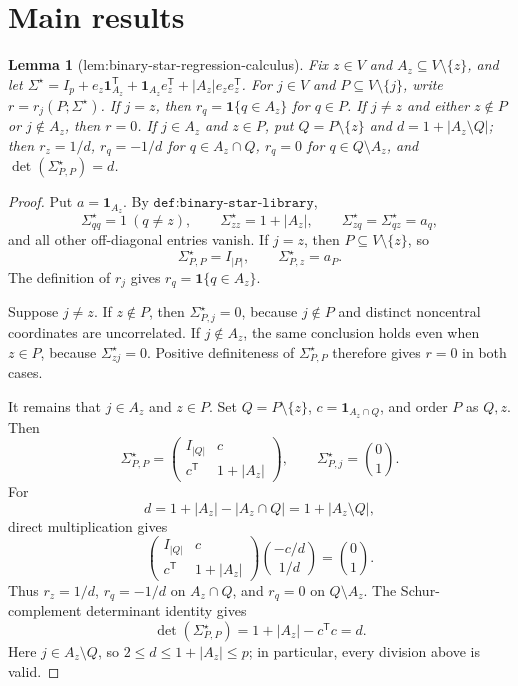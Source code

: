 \documentclass{article}
\newtheorem{lemma}{Lemma}
\begin{document}
\section{Main results}

\begin{lemma}[lem:binary-star-regression-calculus]\label{lem:binary-star-regression-calculus}
Fix \(z\in V\) and \(A_z\subseteq V\setminus\{z\}\), and let \(\Sigma^{\star}=I_p+e_z\mathbf 1_{A_z}^{\mathsf T}+\mathbf 1_{A_z}e_z^{\mathsf T}+|A_z|e_ze_z^{\mathsf T}\). For \(j\in V\) and \(P\subseteq V\setminus\{j\}\), write \(r=r_j(P;\Sigma^{\star})\). If \(j=z\), then \(r_q=\mathbf 1\{q\in A_z\}\) for \(q\in P\). If \(j\neq z\) and either \(z\notin P\) or \(j\notin A_z\), then \(r=0\). If \(j\in A_z\) and \(z\in P\), put \(Q=P\setminus\{z\}\) and \(d=1+|A_z\setminus Q|\); then \(r_z=1/d\), \(r_q=-1/d\) for \(q\in A_z\cap Q\), \(r_q=0\) for \(q\in Q\setminus A_z\), and \(\det(\Sigma^{\star}_{P,P})=d\).
\end{lemma}
\begin{proof}
Put \(a=\mathbf 1_{A_z}\).  By \(\texttt{def:binary-star-library}\),
\[
 \Sigma^{\star}_{qq}=1\ (q\ne z),\qquad
 \Sigma^{\star}_{zz}=1+|A_z|,\qquad
 \Sigma^{\star}_{zq}=\Sigma^{\star}_{qz}=a_q,
\]
and all other off-diagonal entries vanish.  If \(j=z\), then \(P\subseteq V\setminus\{z\}\), so
\[
 \Sigma^{\star}_{P,P}=I_{|P|},\qquad \Sigma^{\star}_{P,z}=a_P.
\]
The definition of \(r_j\) gives \(r_q=\mathbf 1\{q\in A_z\}\).

Suppose \(j\ne z\).  If \(z\notin P\), then \(\Sigma^{\star}_{P,j}=0\), because \(j\notin P\) and distinct noncentral coordinates are uncorrelated.  If \(j\notin A_z\), the same conclusion holds even when \(z\in P\), because \(\Sigma^{\star}_{zj}=0\).  Positive definiteness of \(\Sigma^{\star}_{P,P}\) therefore gives \(r=0\) in both cases.

It remains that \(j\in A_z\) and \(z\in P\).  Set \(Q=P\setminus\{z\}\), \(c=\mathbf 1_{A_z\cap Q}\), and order \(P\) as \(Q,z\).  Then
\[
 \Sigma^{\star}_{P,P}=
 \begin{pmatrix}I_{|Q|}&c\\ c^{\mathsf T}&1+|A_z|\end{pmatrix},
 \qquad
 \Sigma^{\star}_{P,j}=\binom{0}{1}.
\]
For
\[
 d=1+|A_z|-|A_z\cap Q|=1+|A_z\setminus Q|,
\]
direct multiplication gives
\[
 \begin{pmatrix}I_{|Q|}&c\\ c^{\mathsf T}&1+|A_z|\end{pmatrix}
 \binom{-c/d}{1/d}=\binom{0}{1}.
\]
Thus \(r_z=1/d\), \(r_q=-1/d\) on \(A_z\cap Q\), and \(r_q=0\) on \(Q\setminus A_z\).  The Schur-complement determinant identity gives
\[
 \det(\Sigma^{\star}_{P,P})=1+|A_z|-c^{\mathsf T}c=d.
\]
Here \(j\in A_z\setminus Q\), so \(2\le d\le1+|A_z|\le p\); in particular, every division above is valid.
\end{proof}
\end{document}
